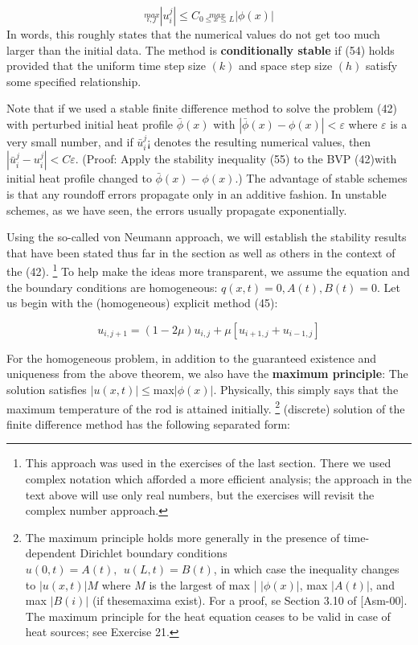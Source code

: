 \documentclass[../main.tex]{subfiles}
\begin{document}
\begin{equation}\label{eqa55}
 \stackrel{max}{_{i,j}} |u_i^j|\leqslant C \stackrel{max}{_{0\leqslant x \leqslant L}} |\phi(x)|
\end{equation}
In words, this roughly states that the numerical values do not get too much larger than the initial data. The method is \textbf{conditionally stable} if (54) holds provided that the uniform time step size $(k)$ and space step size $(h)$ satisfy some specified relationship.


Note that if we used a stable finite difference method to solve the problem (42) with perturbed initial heat profile $\bar{\phi}(x)$ with $|\bar{\phi}(x) - \phi(x)| < \varepsilon$ where $\varepsilon$ is a very small number, and if $ \bar{u}_i^j$¡ denotes the resulting numerical values, then $|\bar{u}_i^j-u_i^j|<C \varepsilon$. (Proof: Apply the stability inequality (55) to the BVP (42)with initial heat profile changed to $\bar{\phi}(x) - \phi(x)$.) The advantage of stable schemes is that any roundoff errors propagate only in an additive fashion. In unstable schemes, as we have seen, the errors usually propagate exponentially. 


Using the so-called von Neumann approach, we will establish the stability results that have been stated thus far in the section as well as others in the context of the (42).
\footnote{This approach was used in the exercises of the last section. There we used complex notation which afforded a more efficient analysis; the approach in the text above will use only real numbers, but the exercises will revisit the complex number approach.}
To help make the ideas more transparent, we assume the equation and the boundary conditions are homogeneous: $q(x,t) = 0, A(t), B(t) = 0$. Let us begin with the (homogeneous) explicit method (45):

$$u_{i,j+1}=(1-2\mu)u_{i,j}+\mu[u_{i+1,j}+u_{i-1,j}]$$

For the homogeneous problem, in addition to the guaranteed existence and uniqueness from the above theorem, we also have the \textbf{maximum principle}: The solution satisfies 
$|u(x,t)|\leqslant $max$ |\phi(x)| $. 
Physically, this simply says that the maximum temperature of the rod is attained initially.
\footnote{The maximum principle holds more generally in the presence of time-dependent Dirichlet boundary conditions $u(0,t)=A(t),~~u(L,t) =B(t)$, in which case the inequality changes to $|u(x,t)|  M$ where $M$ is the largest of max | $|\phi(x)|$, max $|A(t)|$, and max $| B(i) |$ (if thesemaxima exist). For a proof, se Section 3.10 of [Asm-00]. The maximum principle for the heat equation ceases to be valid in case of heat sources; see Exercise 21.}
(discrete) solution of the finite difference method has the following separated form: 
\end{document}
